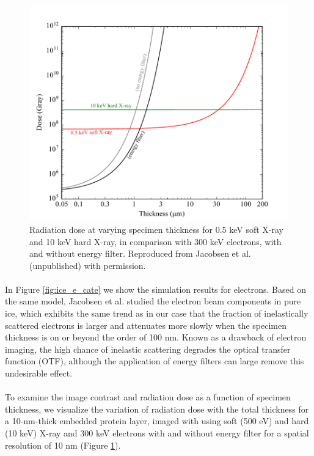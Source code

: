 \documentclass[review]{elsarticle}
\begin{document}
\begin{figure}[b!]
\begin{center}
\includegraphics[scale=0.7]{dose.pdf}
\caption{Radiation dose at varying specimen thickness for 0.5 keV soft X-ray and 10 keV hard X-ray, in comparison with 300 keV electrons, with and without energy filter. Reproduced from Jacobsen et al. (unpublished) with permission.}
\label{fig:dose}
\end{center}
\end{figure}

\paragraph{} In Figure \ref{fig:ice_e_cate} we show the simulation results for electrons. Based on the same model, Jacobsen et al. \cite{Jacobsen:1998vj} studied the electron beam components in pure ice, which exhibits the same trend as in our case that the fraction of inelastically scattered electrons is larger and attenuates more slowly when the specimen thickness is on or beyond the order of 100 nm. Known as a drawback of electron imaging, the high chance of inelastic scattering degrades the optical transfer function (OTF), although the application of energy filters can large remove this undesirable effect. 

\paragraph{} To examine the image contrast and radiation dose as a function of specimen thickness, we visualize the variation of radiation dose with the total thickness for a 10-nm-thick embedded protein layer, imaged with using soft (500 eV) and hard (10 keV) X-ray and 300 keV electrons with and without energy filter for a spatial resolution of 10 nm (Figure \ref{fig:dose}). 
\end{document}
